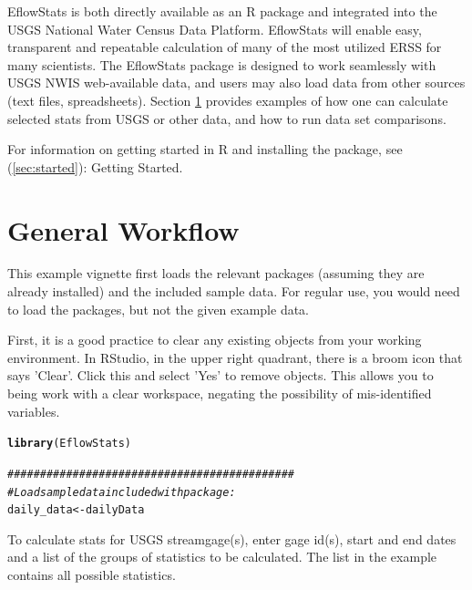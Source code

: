 \documentclass[a4paper,11pt]{article}\usepackage[]{graphicx}\usepackage[]{color}
\makeatletter
\newcommand{\hlcom}[1]{\textcolor[rgb]{0.678,0.584,0.686}{\textit{#1}}}%
\newcommand{\hlstd}[1]{\textcolor[rgb]{0.345,0.345,0.345}{#1}}%
\newcommand{\hlkwb}[1]{\textcolor[rgb]{0.69,0.353,0.396}{#1}}%
\newcommand{\hlkwd}[1]{\textcolor[rgb]{0.737,0.353,0.396}{\textbf{#1}}}%
\newenvironment{kframe}{%
 \def\at@end@of@kframe{}%
 \ifinner\ifhmode%
  \def\at@end@of@kframe{\end{minipage}}%
  \begin{minipage}{\columnwidth}%
 \fi\fi%
 \def\FrameCommand##1{\hskip\@totalleftmargin \hskip-\fboxsep
 \colorbox{shadecolor}{##1}\hskip-\fboxsep
     \hskip-\linewidth \hskip-\@totalleftmargin \hskip\columnwidth}%
 \MakeFramed {\advance\hsize-\width
   \@totalleftmargin\z@ \linewidth\hsize
   \@setminipage}}%
 {\par\unskip\endMakeFramed%
 \at@end@of@kframe}
\newenvironment{knitrout}{}{} %
\makeatother
\begin{document}
EflowStats is both directly available as an R package and integrated into the USGS National Water Census Data Platform. EflowStats will enable easy, transparent and repeatable calculation of many of the most utilized ERSS for many scientists. The EflowStats package is designed to work seamlessly with USGS NWIS web-available data, and users may also load data from other sources (text files, spreadsheets).  Section \ref{sec:exampleWorkflow} provides examples of how one can calculate selected stats from USGS or other data, and how to run data set comparisons. 
              
For information on getting started in R and installing the package, see (\ref{sec:started}): Getting Started.

\section{General Workflow}
\label{sec:exampleWorkflow}

This example vignette first loads the relevant packages (assuming they are already installed) and the included sample data. For regular use, you would need to load the packages, but not the given example data.

First, it is a good practice to clear any existing objects from your working environment. In RStudio, in the upper right quadrant, there is a broom icon that says 'Clear'. Click this and select 'Yes' to remove objects. This allows you to being work with a clear workspace, negating the possibility of mis-identified variables. 

\begin{knitrout}
\color{fgcolor}\begin{kframe}
\begin{alltt}
\hlkwd{library}\hlstd{(EflowStats)}

\hlcom{############################################}
\hlcom{# Load sample data included with package:}
\hlstd{daily_data}\hlkwb{<-}\hlstd{dailyData}
\end{alltt}
\end{kframe}
\end{knitrout}

To calculate stats for USGS streamgage(s), enter gage id(s), start and end dates and a list of the groups of statistics to be calculated. The list in the example contains all possible statistics.
\end{document}
